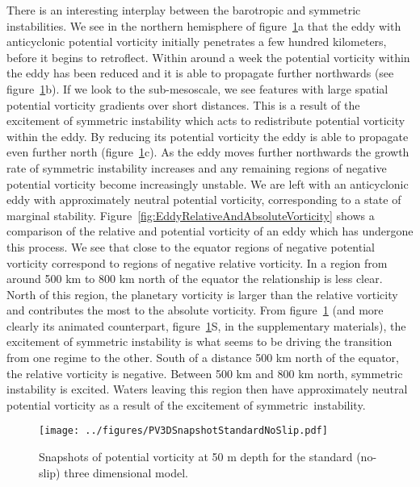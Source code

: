     There is an interesting interplay between the barotropic and symmetric instabilities. We see in the northern hemisphere of figure~\ref{fig:PVStandardNoSlip3D}a that the eddy with anticyclonic potential vorticity initially penetrates a few hundred kilometers, before it begins to retroflect. Within around a week the potential vorticity within the eddy has been reduced and it is able to propagate further northwards (see figure~\ref{fig:PVStandardNoSlip3D}b). If we look to the sub-mesoscale, we see  features with large spatial potential vorticity gradients over short distances. This is a result of the excitement of  symmetric instability which acts to redistribute potential vorticity within the eddy. By reducing its potential vorticity the eddy is able to propagate even further north (figure~\ref{fig:PVStandardNoSlip3D}c). As the eddy moves further northwards the growth rate of symmetric instability increases and any remaining regions of negative potential vorticity become increasingly unstable. We are left with an anticyclonic eddy with approximately neutral potential vorticity, corresponding to a state of marginal stability. Figure~\ref{fig:EddyRelativeAndAbsoluteVorticity} shows a comparison of the relative and potential vorticity of an eddy which has undergone this process. We see that close to the equator regions of negative potential vorticity correspond to regions of negative relative vorticity. In a region from around 500 km to 800 km north of the equator the relationship is less clear. North of this region, the planetary vorticity is larger than the relative vorticity and contributes the most to the absolute vorticity. From figure~\ref{fig:PVStandardNoSlip3D} (and more clearly its animated counterpart, figure~\ref{fig:PVStandardNoSlip3D}S, in the supplementary materials), the excitement of symmetric instability is what seems to be driving the transition from one regime to the other. South of a distance 500 km north of the equator, the relative vorticity is negative. Between 500 km and 800 km north, symmetric instability is excited. Waters leaving this region then have approximately neutral potential vorticity as a result of the excitement of symmetric\ instability.

    \begin{figure}
        \centering
        \texttt{[image: ../figures/PV3DSnapshotStandardNoSlip.pdf]}
        \caption{Snapshots of potential vorticity at 50 m depth for the standard (no-slip) three dimensional model.}
        \label{fig:PVStandardNoSlip3D}
    \end{figure}

